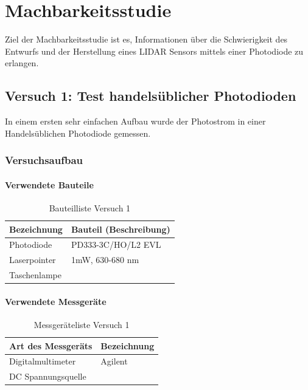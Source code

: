 \chapter{Machbarkeitsstudie}
Ziel der Machbarkeitsstudie ist es, Informationen über die Schwierigkeit des Entwurfs und der Herstellung eines \ac{LIDAR} Sensors mittels einer Photodiode zu erlangen. 

\section{Versuch 1: Test handelsüblicher Photodioden}
In einem ersten sehr einfachen Aufbau wurde der Photostrom in einer Handelsüblichen Photodiode gemessen.
\subsection{Versuchsaufbau}
\subsubsection{Verwendete Bauteile}

\begin{table}[H]
	\centering
	\caption{Bauteilliste Versuch 1}
	\begin{tabular}{|l|l|}
		\hline
		Bezeichnung & Bauteil (Beschreibung)
		\\\hline
		Photodiode & PD333-3C/HO/L2 EVL
		\\\hline
		Laserpointer & 1mW, 630-680 nm
		\\\hline
		Taschenlampe & 
		\\\hline
	\end{tabular}
\end{table}

\subsubsection{Verwendete Messgeräte}
\begin{table}[H]
	\centering
	\caption{Messgeräteliste Versuch 1}
	\begin{tabular}{|l|l|}
		\hline
		Art des Messgeräts & Bezeichnung
		\\\hline
		Digitalmultimeter & Agilent
		\\\hline
		DC Spannungsquelle &
		\\\hline
	\end{tabular}
\end{table}
